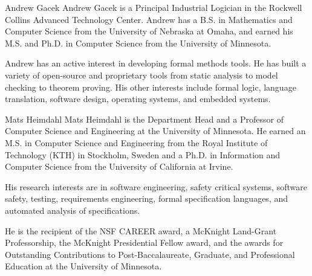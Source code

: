 \documentclass[10pt,journal,compsoc]{IEEEtran}
\begin{document}
\begin{IEEEbiography}{Andrew Gacek}
Andrew Gacek is a Principal Industrial Logician in the Rockwell
Collins Advanced Technology Center. Andrew has a B.S. in Mathematics
and Computer Science from the University of Nebraska at Omaha, and
earned his M.S. and Ph.D. in Computer Science from the University of
Minnesota.

Andrew has an active interest in developing formal methods tools.  He
has built a variety of open-source and proprietary tools from static
analysis to model checking to theorem proving. His other interests
include formal logic, language translation, software design, operating
systems, and embedded systems.
\end{IEEEbiography}

\begin{IEEEbiography}{Mats Heimdahl}
Mats Heimdahl is the Department Head and a Professor of Computer Science and Engineering at the University of Minnesota. He earned an M.S. in Computer Science and Engineering from the Royal Institute of Technology (KTH) in Stockholm, Sweden and a Ph.D. in Information and Computer Science from the University of California at Irvine.

His research interests are in software engineering, safety critical systems, software safety, testing, requirements engineering, formal specification languages, and automated analysis of specifications.

He is the recipient of the NSF CAREER award, a McKnight Land-Grant Professorship, the McKnight Presidential Fellow award, and the awards for Outstanding Contributions to Post-Baccalaureate, Graduate, and Professional Education at the University of Minnesota.
\end{IEEEbiography}
\end{document}
